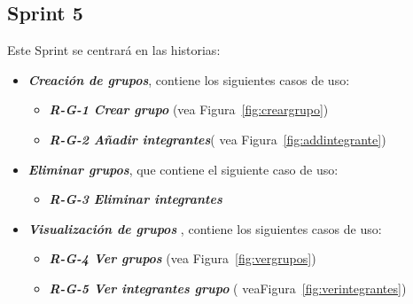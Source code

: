 \subsection{Sprint 5}
Este Sprint se centrará en las historias:

\begin{itemize}
\item \textbf{\textit{Creación de grupos}}, contiene los siguientes casos de uso:
\begin{itemize}
\item\textbf{ \textit{R-G-1 Crear grupo}} (vea  Figura~\ref{fig:creargrupo})
\item\textbf{\textit{ R-G-2 Añadir integrantes}}( vea Figura~\ref{fig:addintegrante})
\end{itemize}
\item \textbf{\textit{Eliminar grupos}}, que contiene el siguiente caso de uso:
\begin{itemize}
\item   \textbf{\textit{R-G-3 Eliminar integrantes}}
\end{itemize}
\item \textbf{\textit{Visualización de grupos}} ,  contiene los siguientes casos de uso:
\begin{itemize}
\item \textbf{\textit{R-G-4 Ver grupos}} (vea Figura~\ref{fig:vergrupos})

\item  \textbf{\textit{R-G-5 Ver integrantes grupo}} ( veaFigura~\ref{fig:verintegrantes})

\end{itemize}
\end{itemize}


 





